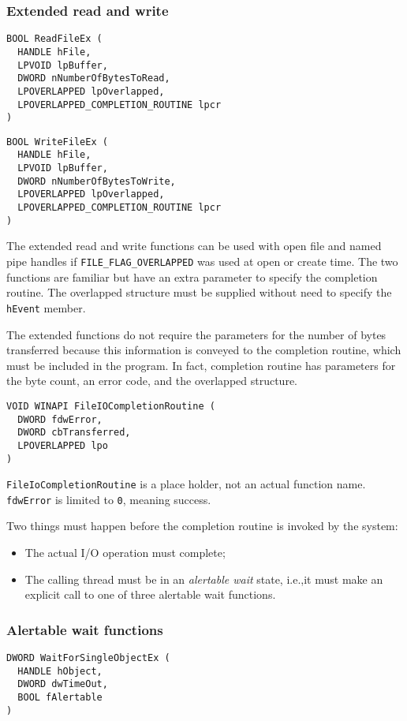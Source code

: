 \subsubsection{Extended read and write}
\begin{verbatim}
BOOL ReadFileEx (
  HANDLE hFile,
  LPVOID lpBuffer,
  DWORD nNumberOfBytesToRead,
  LPOVERLAPPED lpOverlapped,
  LPOVERLAPPED_COMPLETION_ROUTINE lpcr
)
\end{verbatim}

\begin{verbatim}
BOOL WriteFileEx (
  HANDLE hFile,
  LPVOID lpBuffer,
  DWORD nNumberOfBytesToWrite,
  LPOVERLAPPED lpOverlapped,
  LPOVERLAPPED_COMPLETION_ROUTINE lpcr
)
\end{verbatim}

The extended read and write functions can be used with open file and named pipe handles if \texttt{FILE\_FLAG\_OVERLAPPED} was used at open or create time. The two functions are familiar but have an extra parameter to specify the completion routine. The overlapped structure must be supplied without need to specify the \texttt{hEvent} member.

The extended functions do not require the parameters for the number of bytes transferred because this information is conveyed to the completion routine, which must be included in the program. In fact, completion routine has parameters for the byte count, an error code, and the overlapped structure.

\begin{verbatim}
VOID WINAPI FileIOCompletionRoutine (
  DWORD fdwError,
  DWORD cbTransferred,
  LPOVERLAPPED lpo
)
\end{verbatim}
\texttt{FileIoCompletionRoutine} is a place holder, not an actual function name. \texttt{fdwError} is limited to \texttt{0}, meaning success.

Two things must happen before the completion routine is invoked by the system:
\begin{itemize}
\item The actual I/O operation must complete;
\item The calling thread must be in an \emph{alertable wait} state, i.e.,\@ it must make an explicit call to one of three alertable wait functions.
\end{itemize}

\subsubsection{Alertable wait functions}
\begin{verbatim}
DWORD WaitForSingleObjectEx (
  HANDLE hObject,
  DWORD dwTimeOut,
  BOOL fAlertable
)
\end{verbatim}

